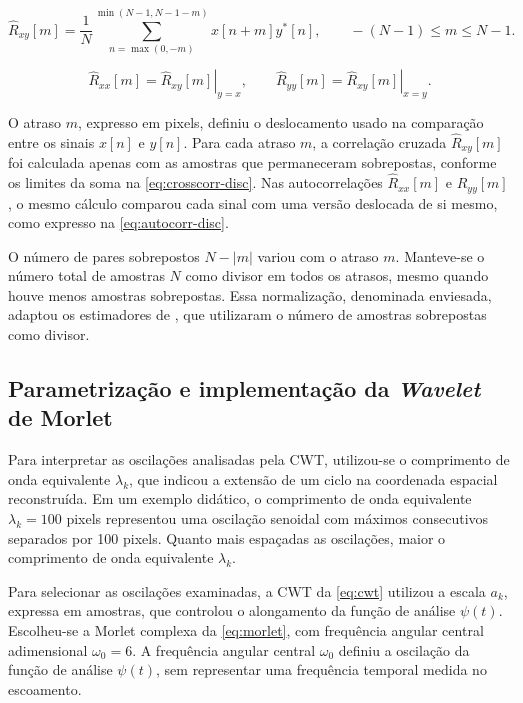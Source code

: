 \begin{equation}\label{eq:crosscorr-disc}
  \widehat R_{xy}[m]=\frac{1}{N}
  \sum_{n=\max(0,-m)}^{\min(N-1,N-1-m)}
  x[n+m]y^*[n],\qquad -(N-1)\leq m\leq N-1.
\end{equation}

\begin{equation}\label{eq:autocorr-disc}
  \widehat R_{xx}[m]=\left.\widehat R_{xy}[m]\right|_{y=x},
  \qquad
  \widehat R_{yy}[m]=\left.\widehat R_{xy}[m]\right|_{x=y}.
\end{equation}

\noindent
O atraso $m$, expresso em pixels, definiu o deslocamento usado na comparação
entre os sinais $x[n]$ e $y[n]$. Para cada atraso $m$, a correlação cruzada
$\widehat R_{xy}[m]$ foi calculada apenas com as amostras que permaneceram
sobrepostas, conforme os limites da soma na \autoref{eq:crosscorr-disc}.
Nas autocorrelações $\widehat R_{xx}[m]$ e $\widehat R_{yy}[m]$, o mesmo
cálculo comparou cada sinal com uma versão deslocada de si mesmo, como
expresso na \autoref{eq:autocorr-disc}.

O número de pares sobrepostos $N-|m|$ variou com o atraso $m$.
Manteve-se o número total de amostras $N$ como divisor em todos os atrasos,
mesmo quando houve menos amostras sobrepostas. Essa normalização, denominada
enviesada, adaptou os estimadores de
, que utilizaram o número de amostras sobrepostas como
divisor.

\subsection{Parametrização e implementação da \textit{Wavelet} de Morlet}\label{sec:met-wco-morlet}

Para interpretar as oscilações analisadas pela CWT, utilizou-se o comprimento
de onda equivalente $\lambda_k$, que indicou a extensão de um ciclo na
coordenada espacial reconstruída. Em um exemplo didático, o comprimento de
onda equivalente $\lambda_k=100$ pixels representou uma oscilação senoidal
com máximos consecutivos separados por 100 pixels. Quanto mais espaçadas
as oscilações, maior o comprimento de onda equivalente $\lambda_k$.

Para selecionar as oscilações examinadas, a CWT da \autoref{eq:cwt} utilizou
a escala $a_k$, expressa em amostras, que controlou o alongamento da função
de análise $\psi(t)$. Escolheu-se a Morlet complexa da \autoref{eq:morlet},
com frequência angular central adimensional $\omega_0=6$. A frequência
angular central $\omega_0$ definiu a oscilação da função de análise $\psi(t)$, sem representar
uma frequência temporal medida no escoamento.

